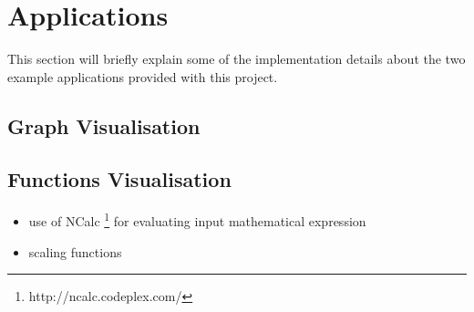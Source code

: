 \section{Applications}
\label{sec:Applications}

This section will briefly explain some of the implementation details about the two example applications provided with this project.

\subsection{Graph Visualisation}

\subsection{Functions Visualisation}

\begin{itemize}
\item use of NCalc \footnote{http://ncalc.codeplex.com/} for evaluating input mathematical expression
\item scaling functions
\end{itemize}




